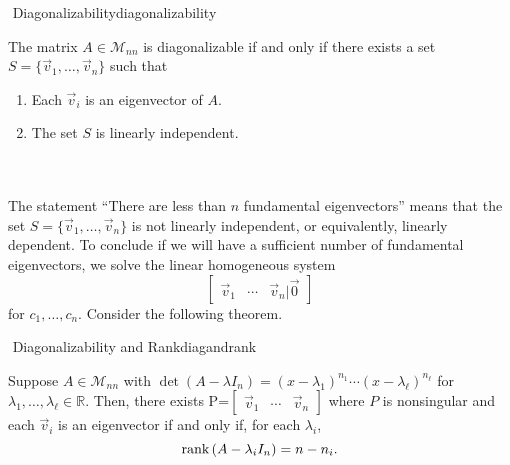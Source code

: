         \begin{theorem}{\Stop\,\,Diagonalizability}{diagonalizability}

            The matrix \(A\in\mathcal{M}_{nn}\) is diagonalizable if and only if there exists a set \(S=\{\vec{v}_1,\ldots,\vec{v}_n\}\) such that
            \begin{enumerate}
                \item Each \(\vec{v}_i\) is an eigenvector of \(A\).
                \item The set \(S\) is linearly independent.
            \end{enumerate}

        \end{theorem}
        \vphantom
        \\
        \\
        The statement ``There are less than \(n\) fundamental eigenvectors'' means that the set \(S=\{\vec{v}_1,\ldots,\vec{v}_n\}\) is not linearly independent, or equivalently, linearly dependent. To conclude if we will have a sufficient number of fundamental eigenvectors, we solve the linear homogeneous system
        \begin{equation*}
            \begin{bmatrix}
                \vec{v}_1 & \cdots & \vec{v}_n | \vec{0}
            \end{bmatrix}
        \end{equation*}
        for \(c_1,\ldots,c_n\). Consider the following theorem.
        \begin{theorem}{\Stop\,\,Diagonalizability and Rank}{diagandrank}
            
            Suppose \(A\in\mathcal{M}_{nn}\) with \(\det(A-\lambda I_n)=(x-\lambda_1)^{n_1}\cdots(x-\lambda_\ell)^{n_\ell}\) for 
            \(\lambda_1,\ldots,\lambda_\ell\in\mathbb{R}\). Then, there exists P=\(\begin{bmatrix} \vec{v}_1 & \cdots & \vec{v}_n \end{bmatrix}\) where \(P\) is nonsingular and each \(\vec{v}_i\) is an eigenvector if and only if, for each \(\lambda_i\),
            \begin{equation*}
                \text{rank\,}(A-\lambda_iI_n)=n-n_i.
            \end{equation*}
            
        \end{theorem}
        \pagebreak
        \vphantom
        \\
        \\
